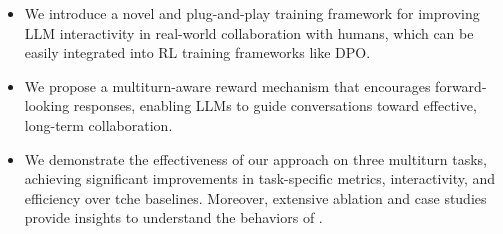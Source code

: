 \begin{itemize}[leftmargin=15pt]
    \item We introduce a novel and plug-and-play training framework for improving LLM interactivity in real-world collaboration with humans, which can be easily integrated into RL training frameworks like DPO.
    
    \item We propose a multiturn-aware reward mechanism that encourages forward-looking responses, enabling LLMs to guide conversations toward effective, long-term collaboration.
    
    \item We demonstrate the effectiveness of our approach on three multiturn tasks, achieving significant improvements in task-specific metrics, interactivity, and efficiency over tche baselines. Moreover, extensive ablation and case studies provide insights to understand the behaviors of \objectst.
\end{itemize}






